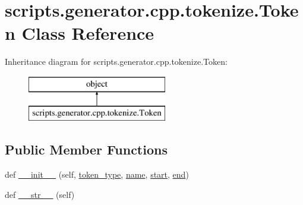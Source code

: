\hypertarget{classscripts_1_1generator_1_1cpp_1_1tokenize_1_1_token}{}\section{scripts.\+generator.\+cpp.\+tokenize.\+Token Class Reference}
\label{classscripts_1_1generator_1_1cpp_1_1tokenize_1_1_token}
Inheritance diagram for scripts.\+generator.\+cpp.\+tokenize.\+Token\+:\begin{figure}[H]
\begin{center}
\leavevmode
\includegraphics[height=2.000000cm]{d3/d5b/classscripts_1_1generator_1_1cpp_1_1tokenize_1_1_token}
\end{center}
\end{figure}
\subsection*{Public Member Functions}
\begin{DoxyCompactItemize}
\item 
def \mbox{\hyperlink{classscripts_1_1generator_1_1cpp_1_1tokenize_1_1_token_a2b86aede9e7e3c614cf75503da3a73ba}{\+\_\+\+\_\+init\+\_\+\+\_\+}} (self, \mbox{\hyperlink{classscripts_1_1generator_1_1cpp_1_1tokenize_1_1_token_ae7baace476aa111c1cb9ab9a79597a94}{token\+\_\+type}}, \mbox{\hyperlink{classscripts_1_1generator_1_1cpp_1_1tokenize_1_1_token_aaf64323e624684c8a7255d948ab98267}{name}}, \mbox{\hyperlink{classscripts_1_1generator_1_1cpp_1_1tokenize_1_1_token_a78ac70cb8204897b044f04d8c42d4b95}{start}}, \mbox{\hyperlink{classscripts_1_1generator_1_1cpp_1_1tokenize_1_1_token_a38569d51b12b9986d02242e878825083}{end}})
\item 
def \mbox{\hyperlink{classscripts_1_1generator_1_1cpp_1_1tokenize_1_1_token_aa18ee07288755fc3515e36fadcfbc9eb}{\+\_\+\+\_\+str\+\_\+\+\_\+}} (self)
\end{DoxyCompactItemize}
